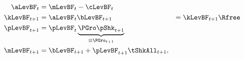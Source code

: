   \begin{equation}\label{eq:DBCparts}
   \begin{split}
     \aLevBF_{t}     & = \mLevBF_{t}-\cLevBF_{t}
\\     \kLevBF_{t+1}   & = \aLevBF_{t} \notag
      \bLevBF_{t+1}    & = \kLevBF_{t+1} \Rfree \notag \\
      \pLevBF_{t+1}  & = \pLevBF_{t} \underbrace{\PGro\pShk_{t+1}}_{\equiv \PGro_{t+1}} \notag \\
      \mLevBF_{t+1}  & =  \bLevBF_{t+1} +\pLevBF_{t+1}\tShkAll_{t+1},\notag
   \end{split}
  \end{equation}
